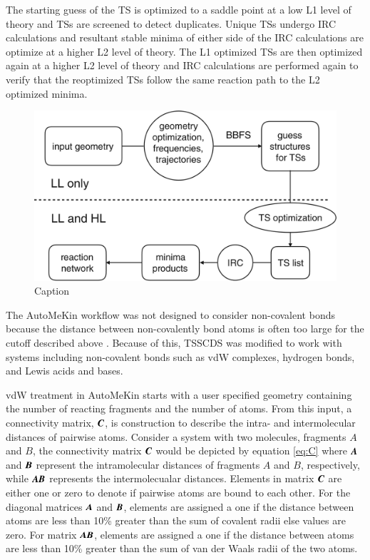 \documentclass[preprint, 11pt]{elsarticle} %
\begin{document}
The starting guess of the TS is optimized to a saddle point at a low L1 level of theory and TSs are screened to detect duplicates.
Unique TSs undergo IRC calculations and resultant stable minima of either side of the IRC calculations are optimize at a higher L2 level of theory. 
The L1 optimized TSs are then optimized again at a higher L2 level of theory and IRC calculations are performed again to verify that the reoptimized TSs follow the same reaction path to the L2 optimized minima. 
\begin{figure}
    \centering
    \includegraphics[width=5in]{tsscds}
    \caption{Caption}
    \label{fig:tsscds}
\end{figure}
The AutoMeKin workflow was not designed to consider non-covalent bonds because the distance between non-covalently bond atoms is often too large for the cutoff described above \cite{Kopec:2019}.
Because of this, TSSCDS was modified to work with systems including non-covalent bonds such as vdW complexes, hydrogen bonds, and Lewis acids and bases.

vdW treatment in AutoMeKin starts with a user specified geometry containing the number of reacting fragments and the number of atoms.
From this input, a connectivity matrix, $\textbf{\textit{C}}$, is construction to describe the intra- and intermolecular distances of pairwise atoms.
Consider a system with two molecules, fragments $\textit{A}$ and $\textit{B}$, the connectivity matrix $\textbf{\textit{C}}$ would be depicted by equation \ref{eq:C} where $\textbf{\textit{A}}$ and $\textbf{\textit{B}}$ represent the intramolecular distances of fragments $\textit{A}$ and $\textit{B}$, respectively, while $\textit{\textbf{AB}}$ represents the intermolecualar distances.
Elements in matrix $\textbf{\textit{C}}$ are either one or zero to denote if pairwise atoms are bound to each other.
For the diagonal matrices $\textbf{\textit{A}}$ and $\textbf{\textit{B}}$, elements are assigned a one if the distance between atoms are less than 10\% greater than the sum of covalent radii else values are zero.
For matrix $\textbf{\textit{AB}}$, elements are assigned a one if the distance between atoms are less than 10\% greater than the sum of van der Waals radii of the two atoms.
\end{document}
